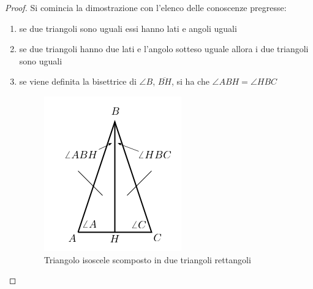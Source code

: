 \begin{proof}

Si comincia la dimostrazione con l'elenco delle conoscenze pregresse:
\begin{enumerate}
\item se due triangoli sono uguali essi hanno lati e angoli uguali
\item se due triangoli hanno due lati e l'angolo sotteso uguale allora i due triangoli sono uguali
\item se viene definita la bisettrice di $\angle B$, $\overline{BH}$, si ha che $\angle ABH = \angle HBC$
\begin{figure}
\centering
\caption{Triangolo isoscele scomposto in due triangoli rettangoli}
\includegraphics[scale=0.5]{img/tri2.png}
\end{figure}


\end{enumerate}
\end{proof}

